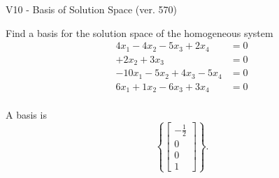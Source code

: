 \begin{exercise}
  \begin{exerciseTitle}V10 - Basis of Solution Space (ver. 570)\end{exerciseTitle}
  \begin{exerciseStatement}
    Find a basis for the solution space of the homogeneous system 
\begin{align*}
 4 x_ 1 -4 x_ 2 -5 x_ 3 + 2 x_ 4 &= 0  \\ 
  + 2 x_ 2 + 3 x_ 3 &= 0  \\ 
  -10 x_ 1 -5 x_ 2 + 4 x_ 3 -5 x_ 4 &= 0  \\ 
  6 x_ 1 + 1 x_ 2 -6 x_ 3 + 3 x_ 4 &= 0  \\ 
 \end{align*}


 
  \end{exerciseStatement}

  \begin{exerciseAnswer}
   A basis is   
\[\left\{\left[\begin{array}{c}
-\frac{1}{2} \\
0 \\
0 \\
1
\end{array}\right]\right\}.\]

  


  \end{exerciseAnswer}
\end{exercise}